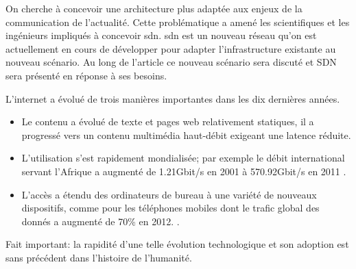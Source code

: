 
 



On cherche à concevoir une architecture plus adaptée aux enjeux de la communication de l'actualité. Cette problématique a amené les scientifiques et les ingénieurs impliqués à concevoir \gls{sdn}. \gls{sdn} est un nouveau  réseau qu'on est actuellement en cours de développer pour adapter l'infrastructure existante au nouveau scénario. Au long de l'article ce nouveau scénario sera discuté et SDN sera présenté en réponse à ses besoins.

L'internet a évolué de trois manières importantes dans les dix dernières années. 
\begin{itemize}
\item Le contenu a évolué de texte et pages web relativement statiques, il a progressé vers un contenu multimédia haut-débit exigeant une latence réduite. 
\item L'utilisation s'est rapidement mondialisée; par exemple le débit international servant l'Afrique a augmenté de 1.21Gbit/s en 2001 à 570.92Gbit/s en 2011 \cite{InternetGlobalGrowthImpactDevelopingCountries}.
\item  L'accès a étendu des ordinateurs de bureau à une variété de nouveaux dispositifs, comme pour les téléphones mobiles dont le trafic global des donnés a augmenté de 70\% en 2012. \cite{CiscoVNI2013}. 
\end{itemize}
Fait important: la rapidité d'une telle évolution technologique et son adoption est sans précédent dans l'histoire de l'humanité. 



